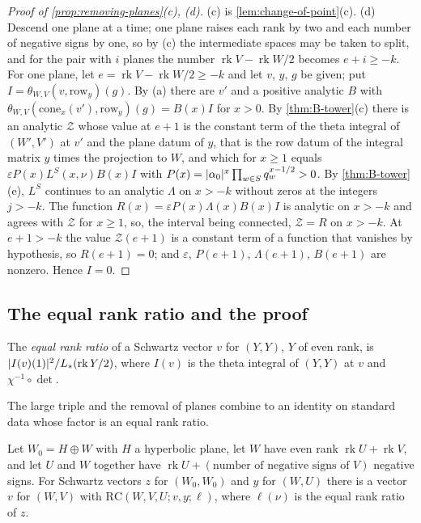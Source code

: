 \begin{proof}[Proof of \cref{prop:removing-planes}(c), (d)]
(c) is \cref{lem:change-of-point}(c). (d) Descend one plane at a time; one plane raises each rank by two and each number of negative signs by one, so by (c) the intermediate spaces may be taken to split, and for the pair with $i$ planes
the number $\operatorname{rk}V-\operatorname{rk}W/2$ becomes $e+i\ge-k$. For one
plane, let $e=\operatorname{rk}V-\operatorname{rk}W/2\ge-k$ and let $v$, $y$, $g$ be given; put $I=\theta_{W,V}(v,\mathrm{row}_y)(g)$. By (a) there are $v'$ and a positive analytic $B$ with
$\theta_{W,V}(\mathrm{cone}_x(v'),\mathrm{row}_y)(g)=B(x)I$ for $x>0$. By \cref{thm:B-tower}(c) there is an analytic $\mathcal Z$ whose value at $e+1$ is the constant term of the theta integral of $(W',V')$ at $v'$
and the plane datum of $y$, that is the row datum of the integral matrix $y$ times the projection to $W$, and which for $x\ge1$ equals $\varepsilon P(x)L^S(x,\nu)B(x)I$ with $P(x)=\lvert \alpha_0\rvert^x\prod_{w\in S}q_w^{x-1/2}>0$. By \cref{thm:B-tower}(e), $L^S$ continues to an analytic $\Lambda$ on
$x>-k$ without zeros at the integers $j>-k$. The function $R(x)=\varepsilon P(x)\Lambda(x)B(x)I$ is analytic on $x>-k$ and agrees with $\mathcal Z$ for $x\ge1$, so, the interval being connected, $\mathcal Z=R$ on
$x>-k$. At $e+1>-k$ the value $\mathcal Z(e+1)$ is a constant term of a function that vanishes by hypothesis, so $R(e+1)=0$; and $\varepsilon$, $P(e+1)$, $\Lambda(e+1)$, $B(e+1)$ are nonzero. Hence $I=0$.
\end{proof}

\subsection{The equal rank ratio and the proof}\label{ss:equal-rank-ratio}
The \emph{equal rank ratio} of a Schwartz vector $v$ for $(Y,Y)$, $Y$ of even rank, is $\lvert I(v)(1)\rvert^2/L_*(\operatorname{rk}Y/2)$, where $I(v)$ is the theta integral of $(Y,Y)$ at $v$ and $\chi^{-1}\circ\det$.

The large triple and the removal of planes combine to an identity on standard data whose factor is an equal rank ratio.

\begin{lemma}\label{lem:top-down}
Let $W_0=H\oplus W$ with $H$ a hyperbolic plane, let $W$ have even rank $\operatorname{rk}U+\operatorname{rk}V$, and let $U$ and $W$ together have $\operatorname{rk}U+(\text{number of negative signs of }V)$ negative signs.
For Schwartz vectors $z$ for $(W_0,W_0)$ and $y$ for $(W,U)$ there is a vector $v$ for $(W,V)$ with $\mathrm{RC}(W,V,U;v,y;\ell)$, where $\ell(\nu)$ is the equal rank ratio of $z$.
\end{lemma}

